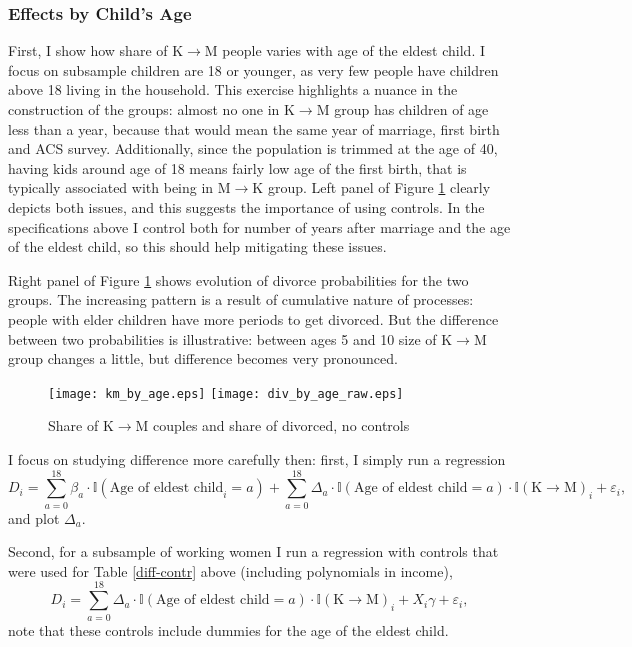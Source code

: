 \documentclass[12pt,letter]{article}
\newcommand{\I}{\mathbb{I}}
\begin{document}
\subsubsection{Effects by Child's Age}
First, I show how share of K$\to$M people varies with age of the eldest child. I focus on subsample children are 18 or younger, as very few people have children above 18 living in the household. This exercise highlights a nuance in the construction of the groups: almost no one in K$\to$M group has children of age less than a year, because that would mean the same year of marriage, first birth and ACS survey. Additionally, since the population is trimmed at the age of 40, having kids around age of 18 means fairly low age of the first birth, that is typically associated with being in M$\to$K group. Left panel of Figure \ref{pics-raw} clearly depicts both issues, and this suggests the importance of using controls. In the specifications above I control both for number of years after marriage and the age of the eldest child, so this should help mitigating these issues.

Right panel of Figure \ref{pics-raw} shows evolution of divorce probabilities for the two groups. The increasing pattern is a result of cumulative nature of processes: people with elder children have more periods to get divorced. But the difference between two probabilities is illustrative: between ages 5 and 10 size of K$\to$M group changes a little, but difference becomes very pronounced.

\begin{figure}[h!]
\texttt{[image: km\_by\_age.eps]}
\texttt{[image: div\_by\_age\_raw.eps]}
\caption{Share of K$\to$M couples and share of divorced, no controls\label{pics-raw}}
\end{figure}

I focus on studying difference more carefully then: first, I simply run a regression
\[D_i = \sum_{a=0}^{18} \beta_a \cdot \I(\text{Age of eldest child}_i = a) +  \sum_{a=0}^{18} \Delta_a \cdot \I(\text{Age of eldest child} = a)\cdot \I(\text{K$\to$M})_i + \varepsilon_i,\]
and plot $\Delta_a$.

Second, for a subsample of working women I run a regression with controls that were used for Table \ref{diff-contr} above (including polynomials in income),
\[D_i = \sum_{a=0}^{18} \Delta_a \cdot \I(\text{Age of eldest child} = a)\cdot \I(\text{K$\to$M})_i + X_i\gamma + \varepsilon_i,\]
note that these controls include dummies for the age of the eldest child.
\end{document}
